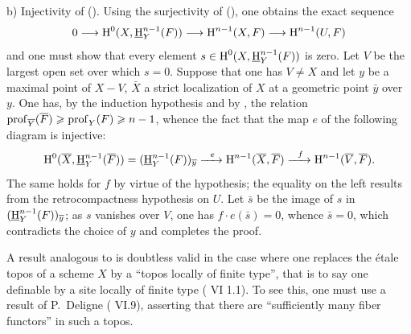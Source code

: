 b) Injectivity of (). Using the surjectivity of (), one obtains the exact sequence
$$0\to \H^0(X, {\h}_Y^{n-1}(F))\to \H^{n-1}(X, F)\to \H^{n-1}(U, F)$$
and one must show that every element $s\in \operatorname{H}^0(X, {\operatorname{\underline{H}}}_Y^{n-1}(F))$ is zero. Let $V$ be the largest open set over which $s=0$. Suppose that one has $V\neq X$ and let $y$ be a maximal point of $X-V$, $\bar X$ a strict localization of $X$ at a geometric point $\bar y$ over~$y$. One has, by the induction hypothesis and by , the relation $\operatorname{prof}_{\overline Y}(\overline F)\geqslant \operatorname{prof}_Y(F)\geqslant n-1$, whence the fact that the map $e$ of the following diagram is injective:
$$
\H^0(\bar X, {\h}_Y^{n-1}(\bar F))= ({\h}_Y^{n-1}(F))_{\bar y}\lto{e} \H^{n-1}(\bar X, \bar F) \lto{f} \H^{n-1}(\bar V, \bar F).
$$
The same holds for $f$ by virtue of the hypothesis; the equality on the left results from the retrocompactness hypothesis on $U$. Let $\bar s$ be the image of $s$ in $({\operatorname{\underline{H}}}_Y^{n-1}(F))_{\overline y}$; as $s$ vanishes over $V$, one has $f\cdot e(\bar s)=0$, whence $\bar s=0$, which contradicts the choice of $y$ and completes the proof.

\begin{remark} \label{XIV.1.9}
A result analogous to  is doubtless valid in the case where one replaces the \'etale topos of a scheme $X$ by a ``topos locally of finite type'', that is to say one definable by a site locally of finite type ( VI 1.1). To see this, one must use a result of P.~Deligne ( VI.9), asserting that there are ``sufficiently many fiber functors'' in such a topos.
\end{remark}
